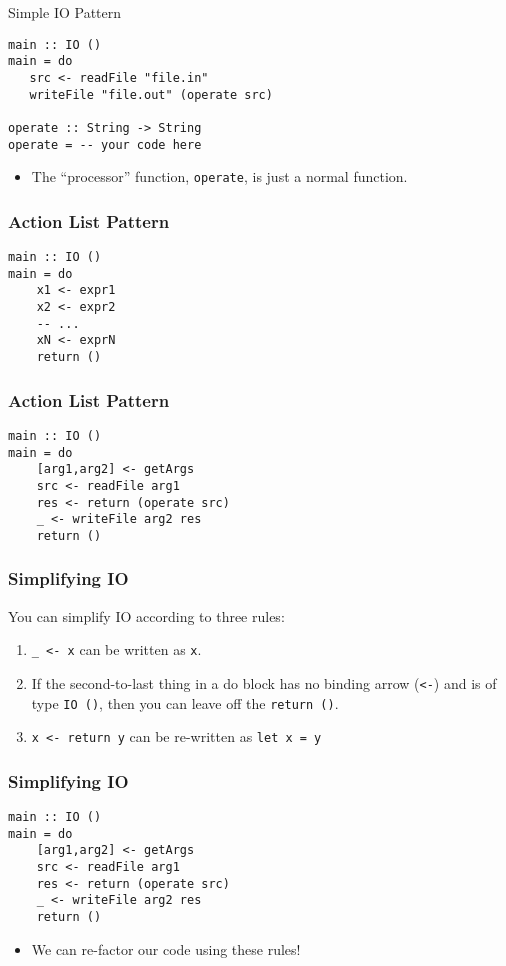 \documentclass{beamer}
\begin{document}
\begin{frame}[containsverbatim]{Simple IO Pattern}
\begin{lstlisting}
main :: IO ()
main = do
   src <- readFile "file.in"
   writeFile "file.out" (operate src)

operate :: String -> String
operate = -- your code here
\end{lstlisting}

\begin{itemize}
\item The ``processor'' function, \lstinline{operate}, is just a normal function.
\end{itemize}
\end{frame}

\begin{frame}[containsverbatim]
\frametitle{Action List Pattern}
\begin{lstlisting}
main :: IO ()
main = do
    x1 <- expr1
    x2 <- expr2
    -- ...
    xN <- exprN
    return ()
\end{lstlisting}
\end{frame}

\begin{frame}[containsverbatim]
\frametitle{Action List Pattern}
\begin{lstlisting}
main :: IO ()
main = do
    [arg1,arg2] <- getArgs
    src <- readFile arg1
    res <- return (operate src)
    _ <- writeFile arg2 res
    return ()
\end{lstlisting}
\end{frame}

\begin{frame}
\frametitle{Simplifying IO}
You can simplify IO according to three rules:
\begin{enumerate}
\item \lstinline{_ <- x} can be written as \lstinline{x}.
\item If the second-to-last thing in a do block has no binding arrow (\lstinline{<-}) and is of type \lstinline{IO ()}, then you can leave off the \lstinline{return ()}.
\item \lstinline{x <- return y} can be re-written as
\lstinline{let x = y}
\end{enumerate}
\end{frame}

\begin{frame}[containsverbatim]
\frametitle{Simplifying IO}
\begin{lstlisting}
main :: IO ()
main = do
    [arg1,arg2] <- getArgs
    src <- readFile arg1
    res <- return (operate src)
    _ <- writeFile arg2 res
    return ()
\end{lstlisting}
\begin{itemize}
\item We can re-factor our code using these rules!
\end{itemize}
\end{frame}
\end{document}
